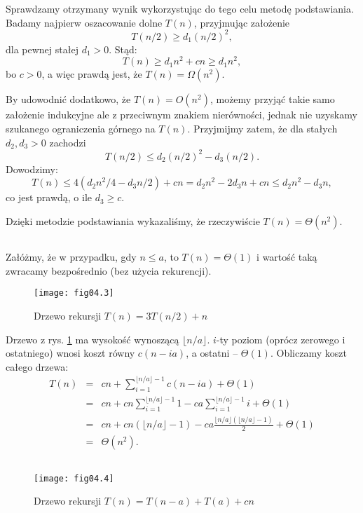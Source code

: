 Sprawdzamy otrzymany wynik wykorzystując do tego celu metodę podstawiania. Badamy najpierw oszacowanie dolne $T(n)$, przyjmując założenie
\[
	T(n/2)\ge d_1(n/2)^2,
\]
dla pewnej stałej $d_1>0$. Stąd:
\[
	T(n)\ge d_1n^2+cn\ge d_1n^2, 
\]
bo $c>0$, a więc prawdą jest, że $T(n)=\Omega(n^2)$.

By udowodnić dodatkowo, że $T(n)=O(n^2)$, możemy przyjąć takie samo założenie indukcyjne ale z przeciwnym znakiem nierówności, jednak nie uzyskamy szukanego ograniczenia górnego na $T(n)$. Przyjmijmy zatem, że dla stałych $d_2,d_3>0$ zachodzi
\[
	T(n/2)\le d_2(n/2)^2-d_3(n/2).
\]
Dowodzimy:
\[
	T(n)\le 4(d_2n^2/4-d_3n/2)+cn=d_2n^2-2d_3n+cn\le d_2n^2-d_3n,
\]
co jest prawdą, o ile $d_3\ge c$.

Dzięki metodzie podstawiania wykazaliśmy, że rzeczywiście $T(n)=\Theta(n^2)$.

\subsection{} %
Załóżmy, że w przypadku, gdy $n\le a$, to $T(n)=\Theta(1)$ i wartość taką zwracamy bezpośrednio (bez użycia rekurencji).
\begin{figure}[h]
	\begin{center}
		\texttt{[image: fig04.3]}
	\end{center}
	\caption{Drzewo rekursji $T(n)=3T(n/2)+n$} \label{fig:4.2-4}
\end{figure}
Drzewo z rys. \ref{fig:4.2-4} ma wysokość wynoszącą $\lfloor n/a\rfloor$. $i$-ty poziom (oprócz zerowego i ostatniego) wnosi koszt równy $c(n-ia)$, a ostatni -- $\Theta(1)$. Obliczamy koszt całego drzewa:
\begin{eqnarray*}
	T(n) &=& cn+\sum_{i=1}^{\lfloor n/a\rfloor-1}c(n-ia)+\Theta(1) \\
	&=& cn+cn\sum_{i=1}^{\lfloor n/a\rfloor-1}1-ca\sum_{i=1}^{\lfloor n/a\rfloor-1}i+\Theta(1) \\
	&=& cn+cn(\lfloor n/a\rfloor-1)-ca\frac{\lfloor n/a\rfloor(\lfloor n/a\rfloor-1)}{2}+\Theta(1) \\
	&=& \Theta(n^2).
\end{eqnarray*}

\subsection{} %
\begin{figure}[h]
	\begin{center}
		\texttt{[image: fig04.4]}
	\end{center}
	\caption{Drzewo rekursji $T(n)=T(n-a)+T(a)+cn$} \label{fig:4.2-5}
\end{figure}

